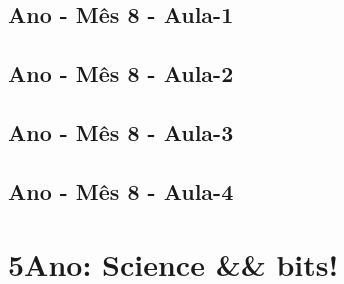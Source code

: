 \begin{multicols}{2}
\section[\sffamily 4\textordmasculine\space Ano - Mês 8 - Aula-1]{\textordmasculine\space Ano - Mês 8 - Aula-1}


\section[\sffamily 4\textordmasculine\space Ano - Mês 8 - Aula-2]{\textordmasculine\space Ano - Mês 8 - Aula-2}


\section[\sffamily 4\textordmasculine\space Ano - Mês 8 - Aula-3]{\textordmasculine\space Ano - Mês 8 - Aula-3}


\section[\sffamily 4\textordmasculine\space Ano - Mês 8 - Aula-4]{\textordmasculine\space Ano - Mês 8 - Aula-4}


\end{multicols}
\chapter[ 5\textordmasculine\space Ano: 
Science \&\& bits!]{5\textordmasculine\space Ano: Science \&\& bits!}



\pagebreak

